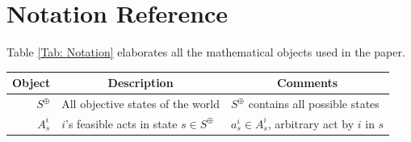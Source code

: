 \documentclass[
11pt,
titlepage,
reqno,
]{article}%
\theoremstyle{definition}
\begin{document}
\section{Notation Reference}
Table \ref{Tab: Notation} elaborates all the mathematical objects used in the paper.
\begin{table}\centering
{}
\begin{tabular}{@{}rll@{}}\toprule
Object                                             & \multicolumn{1}{c}{Description}                       & \multicolumn{1}{c}{Comments}\\ \midrule
$S^\oplus$                                         & All objective states of the world       & $S^\oplus$ contains all possible states\\
$A^i_s$                                           & $i$'s feasible acts in state $s\in S^\oplus$               & $a^i_s\in A^i_s$,  arbitrary act by $i$ in $s$\\

\end{tabular}
\end{table}
\end{document}
